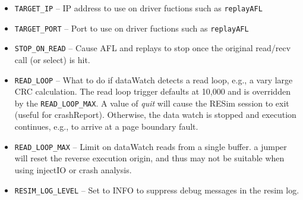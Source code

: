 \documentclass[titlepage]{article}
\begin{document}
\begin{itemize}
\item {\tt TARGET\_IP} -- IP address to use on driver fuctions such as {\tt replayAFL}
\item {\tt TARGET\_PORT} -- Port to use on driver fuctions such as {\tt replayAFL}
\item {\tt STOP\_ON\_READ} -- Cause AFL and replays to stop once the original read/recv call (or select) is hit.
\item {\tt READ\_LOOP} -- What to do if dataWatch detects a read loop, e.g., a vary large CRC calculation.  The read loop trigger defaults at 10,000
and is overridden by the {\tt READ\_LOOP\_MAX}.  A value of \textit{quit} will cause
the RESim session to exit (useful for crashReport).  Otherwise, the data watch is stopped and execution continues, e.g., to arrive at a page boundary fault.
\item {\tt READ\_LOOP\_MAX} -- Limit on dataWatch reads from a single buffer.
a jumper will reset the reverse execution origin, and thus may not be suitable when using injectIO or crash analysis.
\item {\tt RESIM\_LOG\_LEVEL} -- Set to INFO to suppress debug messages in the resim log.

\end{itemize}
\end{document}
